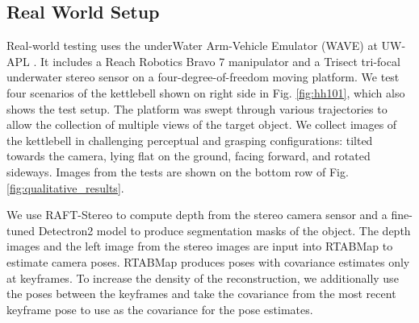\subsection{Real World Setup}
Real-world testing uses the underWater Arm-Vehicle Emulator (WAVE) at UW-APL \cite{rosette_wave_nodate}.  
It includes a Reach Robotics Bravo 7 manipulator \cite{noauthor_underwater_nodate} and a Trisect tri-focal underwater stereo sensor \cite{trisect_web_site} on a four-degree-of-freedom moving platform.
We test four scenarios of the kettlebell shown on right side in Fig. \ref{fig:hh101}, which also shows the test setup.
The platform was swept through various trajectories to allow the collection of multiple views of the target object.
We collect images of the kettlebell in challenging perceptual and grasping configurations: tilted towards the camera, lying flat on the ground, facing forward, and rotated sideways.
Images from the tests are shown on the bottom row of Fig. \ref{fig:qualitative_results}. 

We use RAFT-Stereo \cite{lipson2021raft} to compute depth from the stereo camera sensor and a fine-tuned Detectron2 \cite{wu2019detectron2} model to produce segmentation masks of the object.
The depth images and the left image from the stereo images are input into RTABMap \cite{labbe_rtabmap_2019} to estimate camera poses.
RTABMap produces poses with covariance estimates only at keyframes.
To increase the density of the reconstruction, we additionally use the poses between the keyframes and take the covariance from the most recent keyframe pose to use as the covariance for the pose estimates.